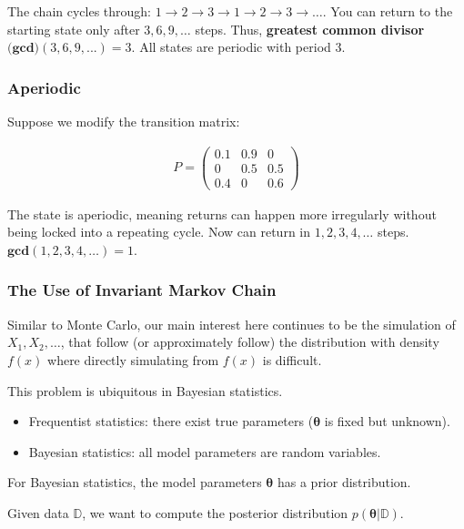 The chain cycles through: $1\rightarrow 2\rightarrow 3\rightarrow1\rightarrow 2\rightarrow 3\rightarrow\ldots$. You can return to the starting state only after $3, 6, 9, \ldots$ steps. Thus, \textbf{greatest common divisor} $\textbf{(gcd)}(3,6,9,...)=3$. All states are periodic with period 3.

\subsubsection{Aperiodic}

\indent 

Suppose we modify the transition matrix:

\begin{align*}
    P = 
    \begin{pmatrix}
        0.1 & 0.9 & 0\\
        0 & 0.5 & 0.5\\
        0.4 & 0 & 0.6
    \end{pmatrix}
\end{align*}

The state is aperiodic, meaning returns can happen more irregularly without being locked into a repeating cycle. Now can return in $1, 2, 3, 4, \ldots$ steps. $\textbf{gcd}(1,2,3,4,\ldots)=1$.

\subsubsection{The Use of Invariant Markov Chain}

\indent 

Similar to Monte Carlo, our main interest here continues to be the simulation of $X_1,X_2,\ldots$, that follow (or approximately follow) the distribution with density $f(x)$ where directly simulating from $f(x)$ is difficult.

This problem is ubiquitous in Bayesian statistics.

\begin{itemize}
    \item Frequentist statistics: there exist true parameters ($\boldsymbol{\theta}$ is fixed but unknown).
    \item Bayesian statistics: all model parameters are random variables.
\end{itemize}

For Bayesian statistics, the model parameters $\boldsymbol{\theta}$ has a prior distribution.

Given data $\mathbb{D}$, we want to compute the posterior distribution $p(\boldsymbol{\theta}|\mathbb{D})$.

